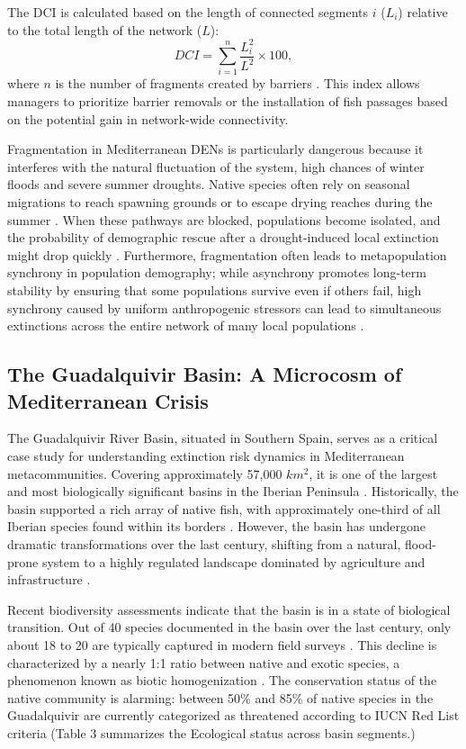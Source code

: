 \documentclass[11pt,a4paper]{article}
\begin{document}
The DCI is calculated based on the length of connected segments $i$ ($L_i$) relative to the total length of the network ($L$):
\begin{equation}
DCI = \sum_{i=1}^{n} \frac{L_i^2}{L^2} \times 100,
\end{equation}
where $n$ is the number of fragments created by barriers \cite{PerkinGido2012}. This index allows managers to prioritize barrier removals or the installation of fish passages based on the potential gain in network-wide connectivity.

Fragmentation in Mediterranean DENs is particularly dangerous because it interferes with the natural fluctuation of the system, high chances of winter floods and severe summer droughts. Native species often rely on seasonal migrations to reach spawning grounds or to escape drying reaches during the summer \cite{FernandezDelgado2007,Herrera2022}. When these pathways are blocked, populations become isolated, and the probability of demographic rescue after a drought-induced local extinction might drop quickly \cite{Larsenetal2021}. Furthermore, fragmentation often leads to metapopulation synchrony in population demography; while asynchrony promotes long-term stability by ensuring that some populations survive even if others fail, high synchrony caused by uniform anthropogenic stressors can lead to simultaneous extinctions across the entire network of many local populations \cite{Larsenetal2021}.

\subsection{The Guadalquivir Basin: A Microcosm of Mediterranean Crisis}
The Guadalquivir River Basin, situated in Southern Spain, serves as a critical case study for understanding extinction risk dynamics in Mediterranean metacommunities. Covering approximately 57,000 $km^2$, it is one of the largest and most biologically significant basins in the Iberian Peninsula \cite{Herrera2022}. Historically, the basin supported a rich array of native fish, with approximately one-third of all Iberian species found within its borders \cite{Herrera2022}. However, the basin has undergone dramatic transformations over the last century, shifting from a natural, flood-prone system to a highly regulated landscape dominated by agriculture and infrastructure \cite{Herrera2022}.

Recent biodiversity assessments indicate that the basin is in a state of biological transition. Out of 40 species documented in the basin over the last century, only about 18 to 20 are typically captured in modern field surveys \cite{FernandezDelgado,Tsirintanis2021}. This decline is characterized by a nearly 1:1 ratio between native and exotic species, a phenomenon known as biotic homogenization \cite{FernandezDelgado,Tsirintanis2021}. The conservation status of the native community is alarming: between 50\% and 85\% of native species in the Guadalquivir are currently categorized as threatened according to IUCN Red List criteria \cite{Herrera2022} (Table 3 summarizes the Ecological status across basin segments.)
\end{document}
